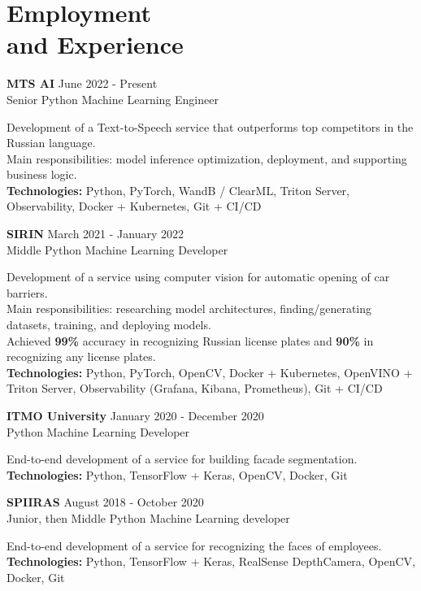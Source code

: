 \section{\sc Employment \\and Experience}
\vspace{2.6pt}

\textbf{MTS AI} \hfill June 2022 - Present \\
Senior Python Machine Learning Engineer

Development of a Text-to-Speech service that outperforms top competitors in the Russian language. \\
Main responsibilities: model inference optimization, deployment, and supporting business logic. \\
\textbf{Technologies:} Python, PyTorch, WandB / ClearML, Triton Server, Observability, Docker + Kubernetes, Git + CI/CD

\textbf{SIRIN} \hfill March 2021 - January 2022 \\
Middle Python Machine Learning Developer

Development of a service using computer vision for automatic opening of car barriers. \\
Main responsibilities: researching model architectures, finding/generating datasets, training, and deploying models. \\
Achieved \textbf{99\%} accuracy in recognizing Russian license plates and \textbf{90\%} in recognizing any license plates. \\
\textbf{Technologies:} Python, PyTorch, OpenCV, Docker + Kubernetes, OpenVINO + Triton Server, Observability (Grafana, Kibana, Prometheus), Git + CI/CD

\textbf{ITMO University} \hfill January 2020 - December 2020 \\
Python Machine Learning Developer

End-to-end development of a service for building facade segmentation. \\
\textbf{Technologies:} Python, TensorFlow + Keras, OpenCV, Docker, Git

\textbf{SPIIRAS} \hfill August 2018 - October 2020 \\
Junior, then Middle Python Machine Learning developer

End-to-end development of a service for recognizing the faces of employees. \\
\textbf{Technologies:} Python, TensorFlow + Keras, RealSense DepthCamera, OpenCV, Docker, Git

\endinput
